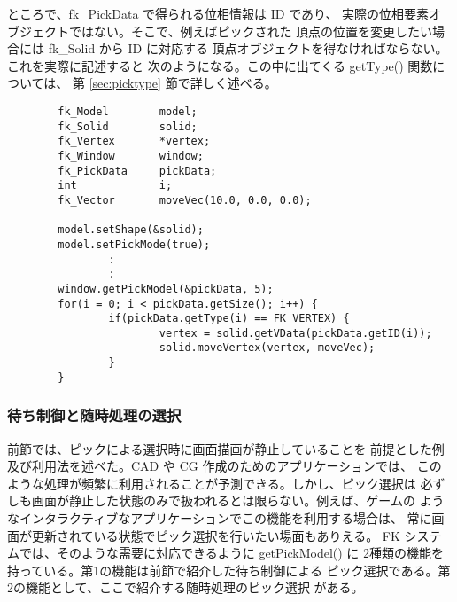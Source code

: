 ところで、fk\_PickData で得られる位相情報は ID であり、
実際の位相要素オブジェクトではない。そこで、例えばピックされた
頂点の位置を変更したい場合には fk\_Solid から ID に対応する
頂点オブジェクトを得なければならない。これを実際に記述すると
次のようになる。この中に出てくる getType() 関数については、
第 \ref{sec:picktype} 節で詳しく述べる。
\\
\begin{breakbox}
\begin{verbatim}
        fk_Model        model;
        fk_Solid        solid;
        fk_Vertex       *vertex;
        fk_Window       window;
        fk_PickData     pickData;
        int             i;
        fk_Vector       moveVec(10.0, 0.0, 0.0);

        model.setShape(&solid);
        model.setPickMode(true);
                :
                :
        window.getPickModel(&pickData, 5);
        for(i = 0; i < pickData.getSize(); i++) {
                if(pickData.getType(i) == FK_VERTEX) {
                        vertex = solid.getVData(pickData.getID(i));
                        solid.moveVertex(vertex, moveVec);
                }
        }
\end{verbatim}
\end{breakbox}
\subsubsection{待ち制御と随時処理の選択}
前節では、ピックによる選択時に画面描画が静止していることを
前提とした例及び利用法を述べた。CAD や CG 作成のためのアプリケーションでは、
このような処理が頻繁に利用されることが予測できる。しかし、ピック選択は
必ずしも画面が静止した状態のみで扱われるとは限らない。例えば、ゲームの
ようなインタラクティブなアプリケーションでこの機能を利用する場合は、
常に画面が更新されている状態でピック選択を行いたい場面もありえる。
FK システムでは、そのような需要に対応できるように getPickModel() に
2種類の機能を持っている。第1の機能は前節で紹介した待ち制御による
ピック選択である。第2の機能として、ここで紹介する随時処理のピック選択
がある。

